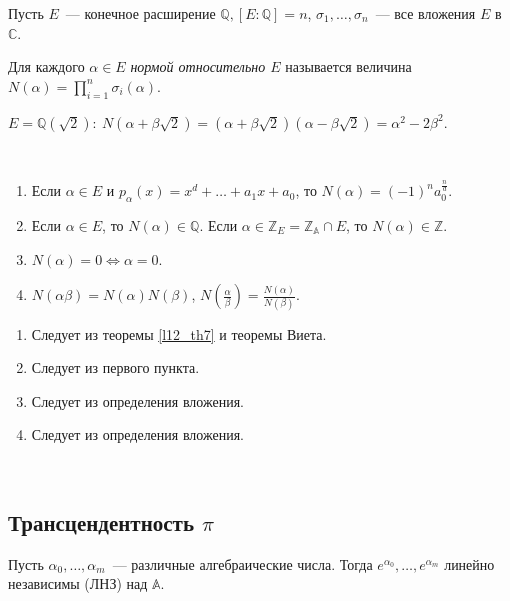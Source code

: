 Пусть $E$ — конечное расширение $\mathbb{Q}, [E:\mathbb{Q}] = n$, $\sigma_1, \ldots, \sigma_n$ — все вложения $E$ в $\mathbb{C}$.

\begin{definition}
	Для каждого  $\alpha \in E$ \textit{нормой относительно $E$}  называется величина\\
	$\displaystyle N(\alpha) = \prod_{i= 1}^{n} \sigma_i(\alpha)$.
\end{definition}

\begin{example}
	$E = \mathbb{Q}(\sqrt{2}): \ N(\alpha + \beta\sqrt{2}) = (\alpha + \beta \sqrt{2})(\alpha - \beta \sqrt{2}) = \alpha^2 - 2\beta^2$.
\end{example}

\begin{theorem}~\ \label{l13_th9}
	\begin{enumerate}[nolistsep]
		\item Если $\alpha \in E$ и $p_{\alpha}(x) = x^d + \ldots + a_1 x + a_0$, то $N(\alpha) = (-1)^n a_0^{\frac{n}{d}}$.
		\item Если $\alpha \in E$, то $N(\alpha) \in \mathbb{Q}$. Если $\alpha \in \mathbb{Z}_E = \mathbb{Z_\mathbb{A}} \cap E$, то $N(\alpha) \in \mathbb{Z}$.
		\item $N(\alpha) = 0 \Leftrightarrow \alpha = 0$.
		\item $N(\alpha \beta) = N(\alpha) N(\beta)$, $N(\frac{\alpha}{\beta}) = \frac{N(\alpha)}{N(\beta)}$.
	\end{enumerate}
\end{theorem}
\begin{pf}
	\begin{enumerate}[nolistsep]
		\item Следует из теоремы \ref{l12_th7} и теоремы Виета.
		\item Следует из первого пункта.
		\item Следует из определения вложения.
		\item Следует из определения вложения.
	\end{enumerate}
\end{pf}~\\

\subsection{Трансцендентность $\pi$}
\begin{theorem} \label{l13_Lin_Vei}
	Пусть $\alpha_0, \ldots, \alpha_m$ — различные алгебраические числа.
	Тогда $e^{\alpha_0}, \ldots, e^{\alpha_m}$ линейно независимы (ЛНЗ) над $\mathbb{A}$.
\end{theorem}


